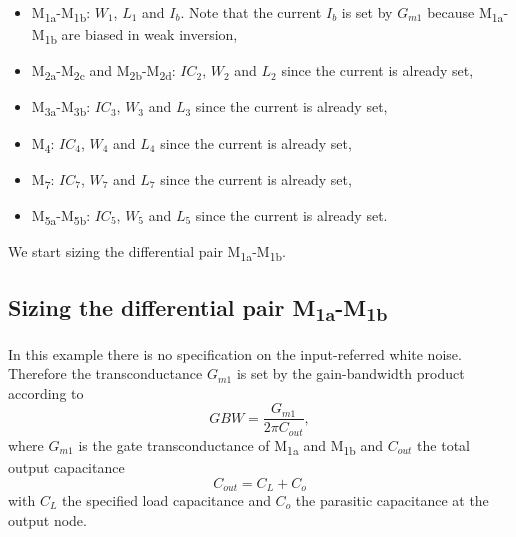 \documentclass[
  a4paper,
  DIV=11,
  numbers=noendperiod]{scrreprt}
\providecommand{\tightlist}{%
  \setlength{\itemsep}{0pt}\setlength{\parskip}{0pt}}\usepackage{longtable,booktabs,array}
\begin{document}
\begin{itemize}
\tightlist
\item
  M\textsubscript{1a}-M\textsubscript{1b}: \(W_1\), \(L_1\) and \(I_b\).
  Note that the current \(I_b\) is set by \(G_{m1}\) because
  M\textsubscript{1a}-M\textsubscript{1b} are biased in weak inversion,
\item
  M\textsubscript{2a}-M\textsubscript{2c} and
  M\textsubscript{2b}-M\textsubscript{2d}: \(IC_2\), \(W_2\) and \(L_2\)
  since the current is already set,
\item
  M\textsubscript{3a}-M\textsubscript{3b}: \(IC_3\), \(W_3\) and \(L_3\)
  since the current is already set,
\item
  M\textsubscript{4}: \(IC_4\), \(W_4\) and \(L_4\) since the current is
  already set,
\item
  M\textsubscript{7}: \(IC_7\), \(W_7\) and \(L_7\) since the current is
  already set,
\item
  M\textsubscript{5a}-M\textsubscript{5b}: \(IC_5\), \(W_5\) and \(L_5\)
  since the current is already set.
\end{itemize}

We start sizing the differential pair
M\textsubscript{1a}-M\textsubscript{1b}.

\subsection{\texorpdfstring{Sizing the differential pair
M\textsubscript{1a}-M\textsubscript{1b}}{Sizing the differential pair M1a-M1b}}\label{sizing-the-differential-pair-m1a-m1b}

In this example there is no specification on the input-referred white
noise. Therefore the transconductance \(G_{m1}\) is set by the
gain-bandwidth product according to \begin{equation}
  GBW = \frac{G_{m1}}{2 \pi C_{out}},
\end{equation} where \(G_{m1}\) is the gate transconductance of
M\textsubscript{1a} and M\textsubscript{1b} and \(C_{out}\) the total
output capacitance \begin{equation}
  C_{out} = C_L + C_o
\end{equation} with \(C_L\) the specified load capacitance and \(C_o\)
the parasitic capacitance at the output node.
\end{document}
